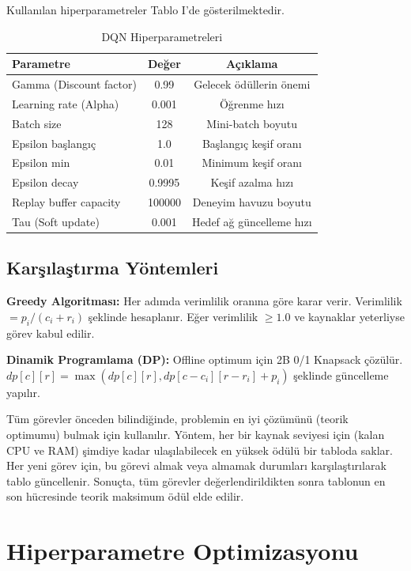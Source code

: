 \documentclass[onecolumn]{IEEEtran}
\begin{document}
Kullanılan hiperparametreler Tablo I'de gösterilmektedir.

\begin{table}[h]
\centering
\caption{DQN Hiperparametreleri}
\begin{tabular}{lcc}
\toprule
\textbf{Parametre} & \textbf{Değer} & \textbf{Açıklama} \\
\midrule
Gamma (Discount factor) & 0.99 & Gelecek ödüllerin önemi \\
Learning rate (Alpha) & 0.001 & Öğrenme hızı \\
Batch size & 128 & Mini-batch boyutu \\
Epsilon başlangıç & 1.0 & Başlangıç keşif oranı \\
Epsilon min & 0.01 & Minimum keşif oranı \\
Epsilon decay & 0.9995 & Keşif azalma hızı \\
Replay buffer capacity & 100000 & Deneyim havuzu boyutu \\
Tau (Soft update) & 0.001 & Hedef ağ güncelleme hızı \\
\bottomrule
\end{tabular}
\label{tab:hyperparams}
\end{table}

\subsection{Karşılaştırma Yöntemleri}

\textbf{Greedy Algoritması:} Her adımda verimlilik oranına göre karar verir. Verimlilik $= p_i / (c_i + r_i)$ şeklinde hesaplanır. Eğer verimlilik $\geq 1.0$ ve kaynaklar yeterliyse görev kabul edilir.

\textbf{Dinamik Programlama (DP):} Offline optimum için 2B 0/1 Knapsack çözülür. $dp[c][r] = \max(dp[c][r], dp[c-c_i][r-r_i] + p_i)$ şeklinde güncelleme yapılır.

Tüm görevler önceden bilindiğinde, problemin en iyi çözümünü (teorik optimumu) bulmak için kullanılır. Yöntem, her bir kaynak seviyesi için (kalan CPU ve RAM) şimdiye kadar ulaşılabilecek en yüksek ödülü bir tabloda saklar. Her yeni görev için, bu görevi almak veya almamak durumları karşılaştırılarak tablo güncellenir. Sonuçta, tüm görevler değerlendirildikten sonra tablonun en son hücresinde teorik maksimum ödül elde edilir.

\section{Hiperparametre Optimizasyonu}
\end{document}
